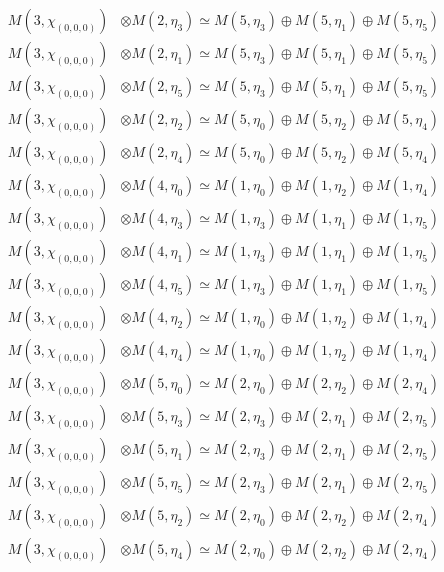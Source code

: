 \begin{align*}
M(3,\chi_{(0,0,0)}) &\otimes M(2,\eta_{3}) \simeq M(5,\eta_{3}) \oplus M(5,\eta_{1}) \oplus M(5,\eta_{5})\\
M(3,\chi_{(0,0,0)}) &\otimes M(2,\eta_{1}) \simeq M(5,\eta_{3}) \oplus M(5,\eta_{1}) \oplus M(5,\eta_{5})\\
M(3,\chi_{(0,0,0)}) &\otimes M(2,\eta_{5}) \simeq M(5,\eta_{3}) \oplus M(5,\eta_{1}) \oplus M(5,\eta_{5})\\
M(3,\chi_{(0,0,0)}) &\otimes M(2,\eta_{2}) \simeq M(5,\eta_{0}) \oplus M(5,\eta_{2}) \oplus M(5,\eta_{4})\\
M(3,\chi_{(0,0,0)}) &\otimes M(2,\eta_{4}) \simeq M(5,\eta_{0}) \oplus M(5,\eta_{2}) \oplus M(5,\eta_{4})\\
M(3,\chi_{(0,0,0)}) &\otimes M(4,\eta_{0}) \simeq M(1,\eta_{0}) \oplus M(1,\eta_{2}) \oplus M(1,\eta_{4})\\
M(3,\chi_{(0,0,0)}) &\otimes M(4,\eta_{3}) \simeq M(1,\eta_{3}) \oplus M(1,\eta_{1}) \oplus M(1,\eta_{5})\\
M(3,\chi_{(0,0,0)}) &\otimes M(4,\eta_{1}) \simeq M(1,\eta_{3}) \oplus M(1,\eta_{1}) \oplus M(1,\eta_{5})\\
M(3,\chi_{(0,0,0)}) &\otimes M(4,\eta_{5}) \simeq M(1,\eta_{3}) \oplus M(1,\eta_{1}) \oplus M(1,\eta_{5})\\
M(3,\chi_{(0,0,0)}) &\otimes M(4,\eta_{2}) \simeq M(1,\eta_{0}) \oplus M(1,\eta_{2}) \oplus M(1,\eta_{4})\\
M(3,\chi_{(0,0,0)}) &\otimes M(4,\eta_{4}) \simeq M(1,\eta_{0}) \oplus M(1,\eta_{2}) \oplus M(1,\eta_{4})\\
M(3,\chi_{(0,0,0)}) &\otimes M(5,\eta_{0}) \simeq M(2,\eta_{0}) \oplus M(2,\eta_{2}) \oplus M(2,\eta_{4})\\
M(3,\chi_{(0,0,0)}) &\otimes M(5,\eta_{3}) \simeq M(2,\eta_{3}) \oplus M(2,\eta_{1}) \oplus M(2,\eta_{5})\\
M(3,\chi_{(0,0,0)}) &\otimes M(5,\eta_{1}) \simeq M(2,\eta_{3}) \oplus M(2,\eta_{1}) \oplus M(2,\eta_{5})\\
M(3,\chi_{(0,0,0)}) &\otimes M(5,\eta_{5}) \simeq M(2,\eta_{3}) \oplus M(2,\eta_{1}) \oplus M(2,\eta_{5})\\
M(3,\chi_{(0,0,0)}) &\otimes M(5,\eta_{2}) \simeq M(2,\eta_{0}) \oplus M(2,\eta_{2}) \oplus M(2,\eta_{4})\\
M(3,\chi_{(0,0,0)}) &\otimes M(5,\eta_{4}) \simeq M(2,\eta_{0}) \oplus M(2,\eta_{2}) \oplus M(2,\eta_{4})\\
\end{align*}

